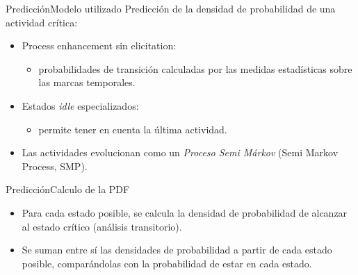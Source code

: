 \documentclass[9pt, handout]{beamer}
\begin{document}
      \begin{frame}{Predicción}{Modelo utilizado}
        \pause
        Predicción de la densidad de probabilidad de una actividad crítica:
        \pause
        \begin{itemize}
          \item Process enhancement sin elicitation:
          \begin{itemize}
            \item probabilidades de transición calculadas por las medidas estadísticas sobre las marcas temporales.
          \end{itemize}
          \pause
          \item Estados \textit{idle} especializados:
          \begin{itemize}
            \item permite tener en cuenta la última actividad.
          \end{itemize}
          \pause
          \item Las actividades evolucionan como un \textit{Proceso Semi Márkov} (Semi Markov Process, SMP).
        \end{itemize}
        
        \pause
      \end{frame}
      
      \begin{frame}{Predicción}{Calculo de la PDF}
        \pause
        \vspace{-1em}
        
      	\pause
      	\begin{itemize}
        	\item Para cada estado posible, se calcula la densidad de probabilidad de alcanzar al estado crítico (análisis transitorio).
        	\pause
        	\item Se suman entre sí las densidades de probabilidad a partir de cada estado posible, comparándolas con la probabilidad de estar en cada estado.
      	\end{itemize}
      	
      	\pause
      	\vspace{-1em}
      \end{frame}
      
\end{document}
